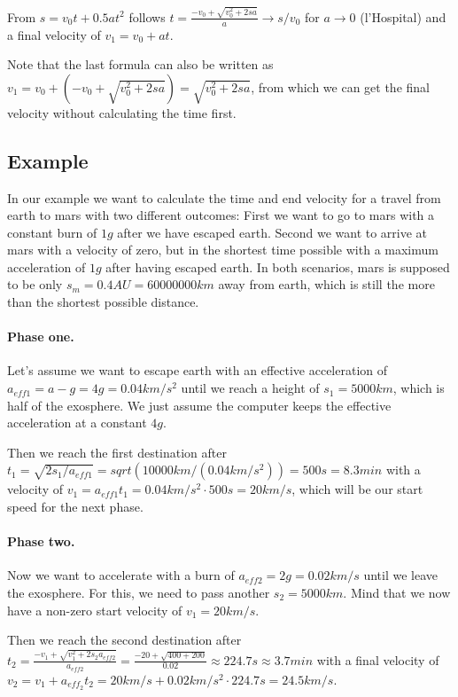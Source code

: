 \documentclass[10pt]{article}
\begin{document}
	From $s = v_0t + 0.5at^2$ follows $t = \frac{-v_0 + \sqrt{v^2_0 + 2sa}}{a} \rightarrow s/v_0$ for $a\rightarrow0$ (l'Hospital) and a final velocity of $v_1 = v_0 + at$.
	
	Note that the last formula can also be written as $v_1=v_0 + (-v_0 + \sqrt{v^2_0+2sa}) = \sqrt{v^2_0+2sa}$, from which we can get the final velocity without calculating the time first.
	
	\subsection{Example}
	
	In our example we want to calculate the time and end velocity for a travel from earth to mars with two different outcomes: First we want to go to mars with a constant burn of $1g$ after we have escaped earth. Second we want to arrive at mars with a velocity of zero, but in the shortest time possible with a maximum acceleration of $1g$ after having escaped earth. In both scenarios, mars is supposed to be only $s_m = 0.4 AU = 60 000 000 km$ away from earth, which is still the more than the shortest possible distance.
	
	\paragraph{Phase one.}
	Let's assume we want to escape earth with an effective acceleration of $a_{eff1} = a-g = 4g = 0.04 km/s^2$ until we reach a height of $s_1=5000 km$, which is half of the exosphere. We just assume the computer keeps the effective acceleration at a constant $4g$.
	
	Then we reach the first destination after $t_1 = \sqrt{2s_1/a_{eff1}} = sqrt(10000km/(0.04km/s^2)) = 500 s = 8.3 min$ with a velocity of $v_1=a_{eff1}t_1=0.04km/s^2\cdot 500s = 20 km/s$, which will be our start speed for the next phase.
	
	\paragraph{Phase two.}
	Now we want to accelerate with a burn of $a_{eff2}=2g=0.02km/s$ until we leave the exosphere. For this, we need to pass another $s_2=5000km$. Mind that we now have a non-zero start velocity of $v_1 = 20 km/s$.
	
	Then we reach the second destination after $t_2 = \frac{-v_1+\sqrt{v^2_1+2s_2a_{eff2}}}{a_{eff2}} =\frac{-20+\sqrt{400+200}}{0.02} \approx 224.7 s \approx 3.7 min $ with a final velocity of $v_2 = v_1 + a_{eff_2}t_2 = 20 km/s + 0.02 km/s^2\cdot 224.7 s = 24.5 km/s$.
	
\end{document}
